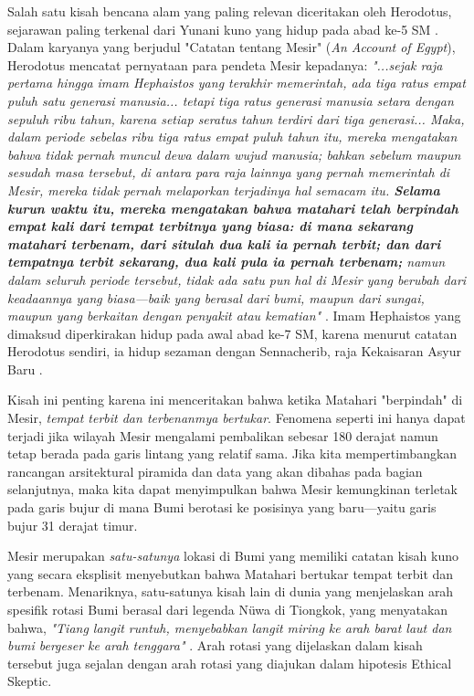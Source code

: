 \documentclass[10pt,twocolumn,letterpaper]{article}
\begin{document}
Salah satu kisah bencana alam yang paling relevan diceritakan oleh Herodotus, sejarawan paling terkenal dari Yunani kuno yang hidup pada abad ke-5 SM \cite{31}. Dalam karyanya yang berjudul "Catatan tentang Mesir" (\textit{An Account of Egypt}), Herodotus mencatat pernyataan para pendeta Mesir kepadanya: \textit{"...sejak raja pertama hingga imam Hephaistos yang terakhir memerintah, ada tiga ratus empat puluh satu generasi manusia... tetapi tiga ratus generasi manusia setara dengan sepuluh ribu tahun, karena setiap seratus tahun terdiri dari tiga generasi... Maka, dalam periode sebelas ribu tiga ratus empat puluh tahun itu, mereka mengatakan bahwa tidak pernah muncul dewa dalam wujud manusia; bahkan sebelum maupun sesudah masa tersebut, di antara para raja lainnya yang pernah memerintah di Mesir, mereka tidak pernah melaporkan terjadinya hal semacam itu. \textbf{Selama kurun waktu itu, mereka mengatakan bahwa matahari telah berpindah empat kali dari tempat terbitnya yang biasa: di mana sekarang matahari terbenam, dari situlah dua kali ia pernah terbit; dan dari tempatnya terbit sekarang, dua kali pula ia pernah terbenam;} namun dalam seluruh periode tersebut, tidak ada satu pun hal di Mesir yang berubah dari keadaannya yang biasa—baik yang berasal dari bumi, maupun dari sungai, maupun yang berkaitan dengan penyakit atau kematian"} \cite{32}. Imam Hephaistos yang dimaksud diperkirakan hidup pada awal abad ke-7 SM, karena menurut catatan Herodotus sendiri, ia hidup sezaman dengan Sennacherib, raja Kekaisaran Asyur Baru \cite{32,33,34}.

Kisah ini penting karena ini menceritakan bahwa ketika Matahari "berpindah" di Mesir, \textit{tempat terbit dan terbenanmya bertukar}. Fenomena seperti ini hanya dapat terjadi jika wilayah Mesir mengalami pembalikan sebesar 180 derajat namun tetap berada pada garis lintang yang relatif sama. Jika kita mempertimbangkan rancangan arsitektural piramida dan data yang akan dibahas pada bagian selanjutnya, maka kita dapat menyimpulkan bahwa Mesir kemungkinan terletak pada garis bujur di mana Bumi berotasi ke posisinya yang baru—yaitu garis bujur 31 derajat timur.

Mesir merupakan \textit{satu-satunya} lokasi di Bumi yang memiliki catatan kisah kuno yang secara eksplisit menyebutkan bahwa Matahari bertukar tempat terbit dan terbenam. Menariknya, satu-satunya kisah lain di dunia yang menjelaskan arah spesifik rotasi Bumi berasal dari legenda Nüwa di Tiongkok, yang menyatakan bahwa, \textit{"Tiang langit runtuh, menyebabkan langit miring ke arah barat laut dan bumi bergeser ke arah tenggara"} \cite{8}. Arah rotasi yang dijelaskan dalam kisah tersebut juga sejalan dengan arah rotasi yang diajukan dalam hipotesis Ethical Skeptic.
\end{document}
